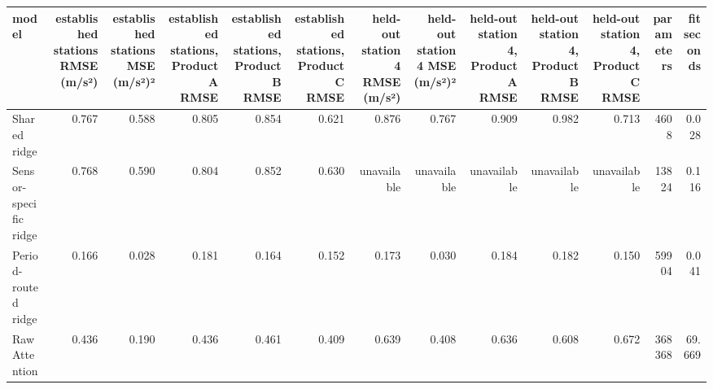 \begin{tabular}{lrrrrrrrrrrrr}
\toprule
model & established stations RMSE (m/s²) & established stations MSE (m/s²)² & established stations, Product A RMSE & established stations, Product B RMSE & established stations, Product C RMSE & held-out station 4 RMSE (m/s²) & held-out station 4 MSE (m/s²)² & held-out station 4, Product A RMSE & held-out station 4, Product B RMSE & held-out station 4, Product C RMSE & parameters & fit seconds \\
\midrule
Shared ridge & 0.767 & 0.588 & 0.805 & 0.854 & 0.621 & 0.876 & 0.767 & 0.909 & 0.982 & 0.713 & 4608 & 0.028 \\
Sensor-specific ridge & 0.768 & 0.590 & 0.804 & 0.852 & 0.630 & unavailable & unavailable & unavailable & unavailable & unavailable & 13824 & 0.116 \\
Period-routed ridge & 0.166 & 0.028 & 0.181 & 0.164 & 0.152 & 0.173 & 0.030 & 0.184 & 0.182 & 0.150 & 59904 & 0.041 \\
Raw Attention & 0.436 & 0.190 & 0.436 & 0.461 & 0.409 & 0.639 & 0.408 & 0.636 & 0.608 & 0.672 & 368368 & 69.669 \\
\bottomrule
\end{tabular}
